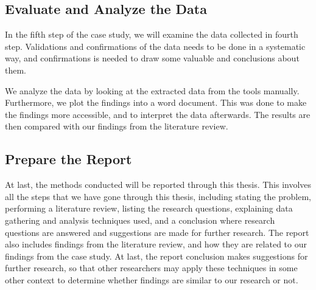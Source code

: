 \subsection{Evaluate and Analyze the Data}
In the fifth step of the case study, we will examine the data collected in fourth step. Validations and confirmations of the data needs to be done in a systematic way, and confirmations is needed to draw some valuable and conclusions about them.

We analyze the data by looking at the extracted data from the tools manually. Furthermore, we plot the findings into a word document. This was done to make the findings more accessible, and to interpret the data afterwards. The results are then compared with our findings from the literature review. 



\subsection{Prepare the Report}
At last, the methods conducted will be reported through this thesis. This involves all the steps that we have gone through this thesis, including stating the problem, performing a literature review, listing the research questions, explaining data gathering and analysis techniques used, and a conclusion where research questions are answered and suggestions are made for further research. The report also includes findings from the literature review, and how they are related to our findings from the case study. At last, the report conclusion makes suggestions for further research, so that other researchers may apply these techniques in some other context to determine whether findings are similar to our research or not.






